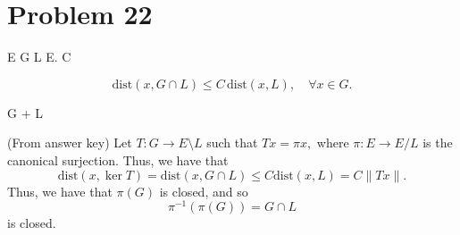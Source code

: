 \documentclass[11pt]{article}
\begin{document}
\section*{Problem 22}
\begin{problem}
  E  G  L  E.  C 


\[
\text{dist}(x, G \cap L) \leq C \, \text{dist}(x, L), \quad \forall x \in G.
\]


 G + L 

\end{problem}
\begin{solution}
    (From answer key) Let $T: G\to E\setminus L$ such that $Tx = \pi x,$ where $\pi: E\to E/ L$ is the canonical surjection. Thus, we have that 
    \[\text{dist}(x, \ker T) = \text{dist}(x, G\cap L) \leq C\text{dist}(x,L) = C \|Tx\|.\] Thus, we have that $\pi(G)$ is closed, and so 
    \[\pi^{-1}(\pi(G)) = G\cap L\] is closed.
\end{solution}


\newpage
\end{document}

